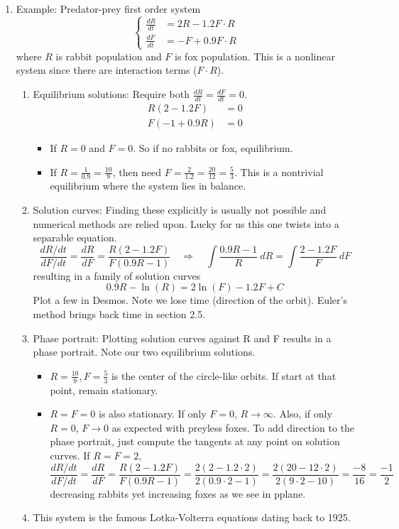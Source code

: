 \documentclass{article}
\newcommand{\ds}{\displaystyle}
\begin{document}
\begin{enumerate}
\item Example: Predator-prey first order system
\[
\begin{cases}
\frac{dR}{dt} &= 2R-1.2 F\cdot R\\
\frac{dF}{dt} &= -F+0.9 F \cdot R 
\end{cases}
\]
where $R$ is rabbit population and $F$ is fox population. This is a nonlinear system since there are interaction terms ($F\cdot R$). 
\begin{enumerate}
\item Equilibrium solutions: Require both $\ds \frac{dR}{dt}=\frac{dF}{dt}=0$.
\begin{align*}
R(2-1.2 F) &= 0 \\
F(-1+0.9R) &= 0
\end{align*}
\begin{itemize}
\item If $R=0$ and $F=0$. So if no rabbits or fox, equilibrium.
\item If $R=\frac{1}{0.9} = \frac{10}{9}$, then need $F=\frac{2}{1.2}=\frac{20}{12}=\frac{5}{3}$. This is a nontrivial equilibrium where the system lies in balance.
\end{itemize}
\item Solution curves: Finding these explicitly is usually not possible and numerical methods are relied upon. Lucky for us this one twists into a separable equation.
\[
\frac{dR/dt}{dF/dt} = \frac{dR}{dF} = \frac{R(2-1.2F)}{F(0.9R-1)}
\quad \Rightarrow \quad
\int \frac{0.9R-1}{R} ~dR = \int \frac{2-1.2F}{F} ~dF 
\]
resulting in a family of solution curves
\[
0.9R - \ln(R) = 2\ln(F)-1.2F + C
\]
Plot a few in Desmos. Note we lose time (direction of the orbit). Euler's method brings back time in section 2.5.
\item Phase portrait: Plotting solution curves against R and F results in a phase portrait. Note our two equilibrium solutions.
\begin{itemize}
\item $R=\frac{10}{9}, F=\frac{5}{3}$ is the center of the circle-like orbits. If start at that point, remain stationary.
\item $R=F=0$ is also stationary. If only $F=0$, $R\rightarrow \infty$. Also, if only $R=0$, $F \rightarrow 0$ as expected with preyless foxes.
To add direction to the phase portrait, just compute the tangents at any point on solution curves. If $R=F=2$,
\[
\frac{dR/dt}{dF/dt} = \frac{dR}{dF} = \frac{R(2-1.2F)}{F(0.9R-1)} = \frac{2(2-1.2\cdot 2)}{2(0.9\cdot 2-1)}
= \frac{2(20-12\cdot 2)}{2(9\cdot 2-10)}
= \frac{-8}{16} = \frac{-1}{2}
\]
decreasing rabbits yet increasing foxes as we see in pplane.
\end{itemize}
\item This system is the famous Lotka-Volterra equations dating back to 1925.
\end{enumerate}


\end{enumerate}
\end{document}
